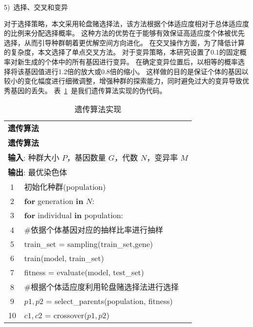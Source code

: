 5)~选择、交叉和变异\par
对于选择策略，本文采用轮盘赌选择法，该方法根据个体适应度相对于总体适应度的比例来分配选择概率。
这种方法的优势在于能够有效保证高适应度个体被优先选择，从而引导种群朝着更优解空间方向进化。
在交叉操作方面，为了降低计算的复杂度，本文选择了单点交叉方法。
对于变异策略，本研究设置了0.1的固定概率对新生成的个体中的所有基因进行变异。
在确定变异位置后，以相等的概率选择将该基因值进行1.2倍的放大或0.8倍的缩小。
这样做的目的是保证个体的基因以较小的变化幅度进行细微调整，增强种群的探索能力，同时避免过大的变异导致优秀基因的丢失。
表~\ref{tab:genetic_algorithm}~是我们遗传算法实现的伪代码。
\begin{table}[h]
	\caption{遗传算法实现}
	\label{tab:genetic_algorithm}
	\centering
	\begin{tabularx}{1.0\textwidth}{cl}
		\toprule
		\multicolumn{2}{l}{\textbf{遗传算法}}                                               \\
		\multicolumn{2}{l}{\textbf{遗传算法}}                                               \\
		\midrule
		\multicolumn{2}{l}{\textbf{输入}: 种群大小 $P$，基因数量 $G$，代数 $N$，变异率 $M$} \\
		\multicolumn{2}{l}{\textbf{输出}: 最优染色体}                                       \\
		1  & 初始化种群(population)                                                         \\
		2  & \textbf{for} generation \textbf{in} $N$:                                       \\
		3  & \quad \textbf{for} individual \textbf{in} population:                          \\
		4  & \quad\quad \#依据个体基因对应的抽样比率进行抽样                                \\
		5  & \quad\quad train\_set = sampling(train\_set,gene)                              \\
		6  & \quad\quad train(model, train\_set)                                            \\
		7  & \quad\quad fitness = evaluate(model, test\_set)                                \\
		8  & \quad \#根据个体适应度利用轮盘赌选择法进行选择                                 \\
		9  & \quad $p1, p2$ = select\_parents(population, fitness)                          \\
		10 & \quad $c1, c2$ = crossover($p1, p2$)                                           \\

\end{tabularx}
\end{table}
